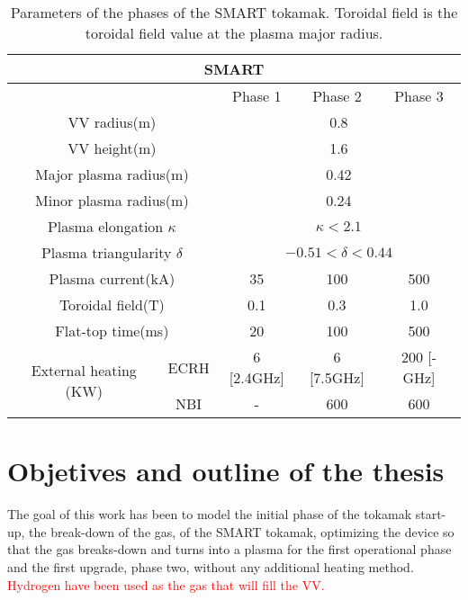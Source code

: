 \documentclass[a4paper,12pt,oneside]{book}
\begin{document}
\begin{table}[h!]
\centering
	\begin{tabular}{|c|c|c|c|c|} \hline
		\multicolumn{5}{|c|}{SMART}\\ \hline
		 \multicolumn{2}{|c|}{} & Phase 1 & Phase 2 & Phase 3 \\ \hline
		\multicolumn{2}{|c|}{VV radius(m)} & \multicolumn{3}{|c|}{0.8} \\ \hline
		\multicolumn{2}{|c|}{VV height(m)} & \multicolumn{3}{|c|}{1.6} \\ \hline
		\multicolumn{2}{|c|}{Major plasma radius(m)} & \multicolumn{3}{|c|}{0.42} \\ \hline
		\multicolumn{2}{|c|}{Minor plasma radius(m)} & \multicolumn{3}{|c|}{0.24} \\ \hline
		\multicolumn{2}{|c|}{Plasma elongation $\kappa$} & \multicolumn{3}{|c|}{$\kappa<2.1$} \\ \hline
		\multicolumn{2}{|c|}{Plasma triangularity $\delta$} & \multicolumn{3}{|c|}{$-0.51< \delta < 0.44$} \\ \hline
		\multicolumn{2}{|c|}{Plasma current(kA)} & 35 & 100 & 500  \\ \hline
		\multicolumn{2}{|c|}{Toroidal field(T)} & 0.1 & 0.3 & 1.0  \\ \hline
		\multicolumn{2}{|c|}{Flat-top time(ms)} & 20 & 100 & 500 \\ \hline
		\multirow{2}{*}{External heating (KW)} & ECRH & 6 [2.4GHz] & 6 [7.5GHz] & 200 [- GHz] \\ \cline{2-5}
		 & NBI  & - & 600 & 600 \\ \hline
	\end{tabular}
	\caption{Parameters of the phases of the SMART tokamak. Toroidal field is the toroidal field value at the plasma major radius.}
	\label{table_SMART_parameters}
\end{table}
%

\section{Objetives and outline of the thesis}

The goal of this work has been to model the initial phase of the tokamak start-up, the break-down of the gas, of the SMART tokamak, optimizing the device so that the gas breaks-down and turns into a plasma for the first operational phase and the first upgrade, phase two, without any additional heating method. \textcolor{red}{Hydrogen have been used as the gas that will fill the VV.}
\end{document}
